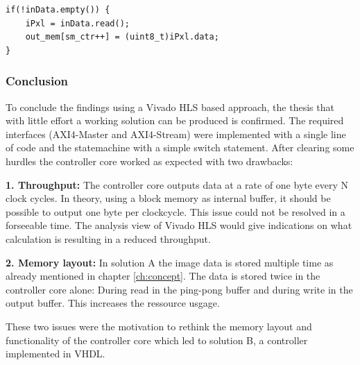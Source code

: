 \begin{minipage}{\textwidth}
\begin{lstlisting}[style=CStyle, caption=Pixel read store with query,
label=lst:runinstream2]
if(!inData.empty()) {
    iPxl = inData.read();
    out_mem[sm_ctr++] = (uint8_t)iPxl.data;
}\end{lstlisting}
\end{minipage}

\clearpage
\subsubsection*{Conclusion}
To conclude the findings using a Vivado HLS based approach, the thesis that
with little effort a working solution can be produced is confirmed. The required
interfaces (AXI4-Master and AXI4-Stream) were implemented with a single line of
code and the statemachine with a simple switch statement. After
clearing some hurdles the controller core worked as expected with two drawbacks:

\vspace{1ex}
\textbf{1. Throughput:} The controller core outputs data at a rate of one byte
every N clock cycles. In theory, using a block memory as internal buffer, it
should be possible to output one byte per clockcycle. This issue could not be
resolved in a forseeable time. The analysis view of Vivado HLS would give
indications on what calculation is resulting in a reduced throughput.

\vspace{1ex}
\textbf{2. Memory layout:} In solution A the image data is stored multiple time
as already mentioned in chapter \ref{ch:concept}. The data is stored twice in
the controller core alone: During read in the ping-pong buffer and during write
in the output buffer. This increases the ressource usgage.

\vspace{1ex}
These two issues were the motivation to rethink the memory layout and
functionality of the controller core which led to solution B, a controller
implemented in VHDL.



